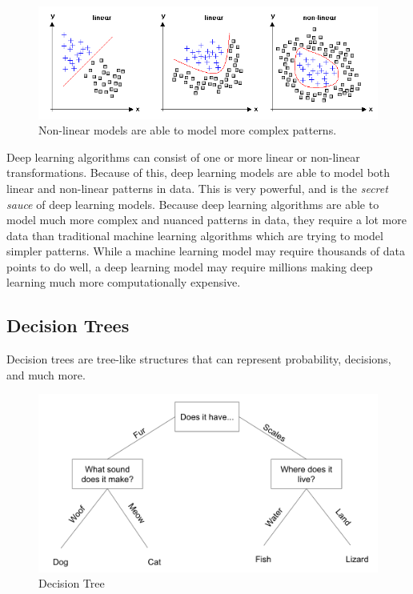 \documentclass{article}
\begin{document}
\begin{figure}[H]
    \centering
    \includegraphics[width=5.0in]{linearvsnonlinear.png}
    \caption{Non-linear models are able to model more complex patterns.}
\end{figure}

Deep learning algorithms can consist of one or more linear or non-linear transformations. Because of this, deep learning models are able to model both linear and non-linear patterns in data. This is very powerful, and is the \textit{secret sauce} of deep learning models. Because deep learning algorithms are able to model much more complex and nuanced patterns in data, they require a lot more data than traditional machine learning algorithms which are trying to model simpler patterns. While a machine learning model may require thousands of data points to do well, a deep learning model may require millions making deep learning much more computationally expensive.

\newpage
\subsection{Decision Trees} 
Decision trees are tree-like structures that can represent probability, decisions, and much more.

\begin{figure}[H]
    \centering
    \includegraphics[width=4.5in]{decisiontree.png}
    \caption{Decision Tree}
\end{figure}
\end{document}
